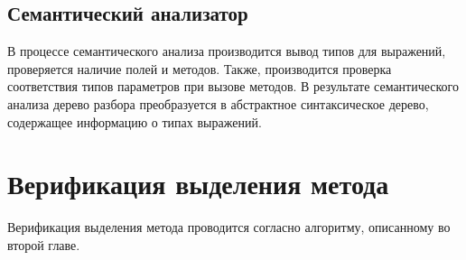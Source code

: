 \subsection{Семантический анализатор}
В процессе семантического анализа производится вывод типов для выражений, проверяется наличие полей и методов.
Также, производится проверка соответствия типов параметров при вызове методов.
В результате семантического анализа дерево разбора преобразуется в абстрактное синтаксическое дерево,
содержащее информацию о типах выражений.
\section{Верификация выделения метода}
Верификация выделения метода проводится согласно алгоритму, описанному во второй главе.